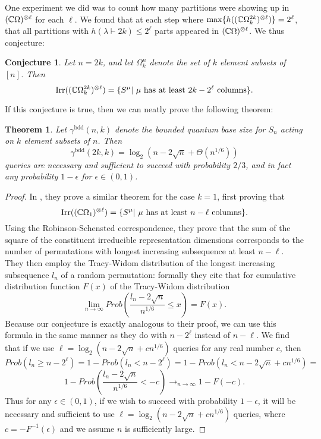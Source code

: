 \documentclass[12pt,twoside]{reedthesis}
\theoremstyle{plain}   %
\newtheorem{thm}{Theorem}[section] %
\newtheorem{conj}{Conjecture}[section]
\theoremstyle{definition}
\theoremstyle{remark}
\numberwithin{equation}{section}
\def\irr{\mathrm{Irr}}
\begin{document}
One experiment we did was to count how many partitions were showing up in $(\mathbb{C} \Omega)^{\otimes \ell}$ for each $\ell$.
We found that at each step where $\max\{h((\mathbb{C} \Omega_k^{2k})^{\otimes \ell})\} = 2^\ell$, that all partitions with $h(\lambda \vdash 2k) \leq 2^\ell$ parts appeared in $(\mathbb{C} \Omega)^{\otimes \ell}$.
We thus conjecture:
\begin{conj}
  \label{thm:numcols}
  Let $n = 2k$, and let $\Omega^{n}_k$ denote the set of $k$ element subsets of $[n]$. Then
  \[\irr((\CC \Omega^{2k}_k)^{\otimes \ell}) = \{S^\mu |  \text{ $\mu$ has at least $2k - 2^\ell$ columns}\}.\]
\end{conj}
If this conjecture is true, then we can neatly prove the following theorem:
\begin{thm}
  Let $\gamma^{\mathrm{bdd}}(n,k)$ denote the bounded quantum base size for $S_n$ acting on $k$ element subsets of $n$. Then
  \[ \gamma^{\mathrm{bdd}}(2k,k) = \log_2(n -2\sqrt{n} + \Theta(n^{1/6}))\]
  queries are necessary and sufficient to succeed with probability $2/3$, and in fact any probability $1 - \epsilon$ for $\epsilon \in (0,1)$.
\end{thm}
\begin{proof}
  In \cite{copeland}, they prove a similar theorem for the case $k=1$, first proving that
  \[\irr((\CC \Omega_1)^{\otimes\ell}) = \{ S^\mu | \text{ $\mu$ has at least $n - \ell$ columns}\}.\]
  Using the Robinson-Schensted correspondence, they prove that the sum of the square of the constituent irreducible representation dimensions corresponds to the number of permutations with longest increasing subsequence
  at least $n-\ell$.
  They then employ the Tracy-Widom distribution
  of the longest increasing subsequence $l_n$ of a random permutation: formally they cite that for cumulative distribution function $F(x)$ of the Tracy-Widom distribution
  \[ \lim_{n \rightarrow \infty} Prob \left( \dfrac{l_n - 2 \sqrt{n}}{n^{1/6}} \leq x \right) = F(x).\]
  Because our conjecture is exactly analogous to their proof, we can use this formula in the same manner as they do with $n- 2^\ell$ instead of $n -\ell$.
  We find that if we use $\ell = \log_2( n - 2 \sqrt{n} + cn^{1/6})$ queries for any real number $c$, then
  \[Prob( l_n \geq n - 2^\ell) = 1 - Prob( l_n <  n - 2^\ell) = 1 - Prob( l_n <  n - 2 \sqrt{n} + cn^{1/6}) = \]
  \[ 1 - Prob \left(\dfrac{l_n - 2 \sqrt{n}}{n^{1/6}} < -c \right) \rightarrow_{n \rightarrow \infty} 1 - F(-c).\]
  Thus for any $\epsilon \in (0,1)$, if we wish to succeed with probability $1- \epsilon$, it will be necessary and sufficient to use $\ell = \log_2( n - 2 \sqrt{n} + cn^{1/6})$ queries, where $c = -F^{-1}(\epsilon)$
  and we assume $n$ is sufficiently large.
\end{proof}
\end{document}
